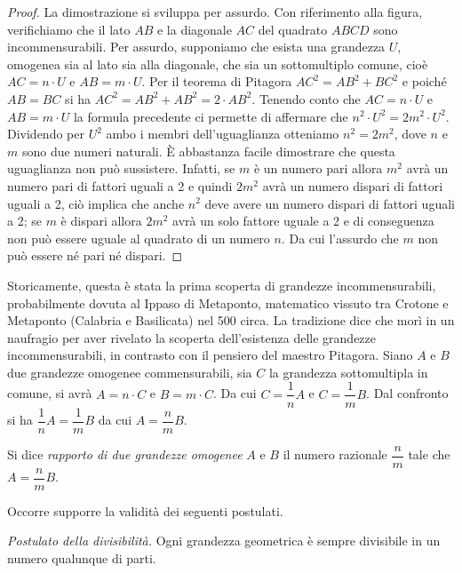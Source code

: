 \begin{proof}
La dimostrazione si sviluppa per assurdo. Con riferimento alla 
figura, verifichiamo che  il lato $AB$ e la diagonale $AC$ del 
quadrato $ABCD$ sono incommensurabili.
Per assurdo, supponiamo che esista una grandezza $U$, omogenea sia al 
lato sia alla diagonale, che sia un sottomultiplo comune, cioè 
$AC=n\cdot U$ e $AB=m\cdot U$.
Per il teorema di Pitagora $AC^2=AB^2+BC^2$ e poiché $AB=BC$ si ha 
$AC^2=AB^2+AB^2=2\cdot AB^2$. Tenendo conto che $AC=n\cdot U$ e 
$AB=m\cdot U$ la formula precedente ci permette di affermare che 
$n^2\cdot U^2=2m^2\cdot U^2$. Dividendo per $U^2$ ambo i membri 
dell'uguaglianza otteniamo $n^2=2m^2$, dove $n$ e $m$ sono due numeri 
naturali. \`E abbastanza facile dimostrare che questa uguaglianza non 
può sussistere. Infatti, se $m$ è un numero pari allora $m^2$ avrà un 
numero pari di fattori uguali a 2 e quindi $2m^2$ avrà un numero 
dispari di fattori uguali a 2, ciò implica che anche $n^2$ deve avere 
un numero dispari di fattori uguali a 2; se $m$ è dispari allora 
$2m^2$ avrà un solo fattore uguale a 2 e di conseguenza non può 
essere uguale al quadrato di un numero $n$. Da cui l'assurdo che $m$ 
non può essere né pari né dispari.
\end{proof}

Storicamente, questa è stata la prima scoperta di grandezze 
incommensurabili, probabilmente dovuta al Ippaso di Metaponto, 
matematico vissuto tra Crotone e Metaponto (Calabria e Basilicata) 
nel 500 \aC circa. La tradizione dice che morì in un naufragio per 
aver rivelato la scoperta dell'esistenza delle grandezze 
incommensurabili, in contrasto con il pensiero del maestro Pitagora.
Siano $A$ e $B$ due grandezze omogenee commensurabili, sia $C$ la 
grandezza sottomultipla in comune, si avrà $A=n\cdot C$ e $B=m\cdot 
C$. Da cui $C=\dfrac{1}{n}A$ e $C=\dfrac{1}{m}B$. Dal confronto si ha 
$\dfrac{1}{n}A=\dfrac{1}{m}B$ da cui $A=\dfrac{n}{m}B$.

\begin{definizione}
Si dice \emph{rapporto di due grandezze omogenee} $A$ e $B$ il numero 
razionale $\dfrac{n}{m}$ tale che $A=\dfrac{n}{m}B$.
\end{definizione}
Occorre supporre la validità dei seguenti postulati.\vspace{8pt}

\noindent \emph{Postulato della divisibilità.} Ogni grandezza 
geometrica è sempre divisibile in un numero qualunque di 
parti.\vspace{8pt}

